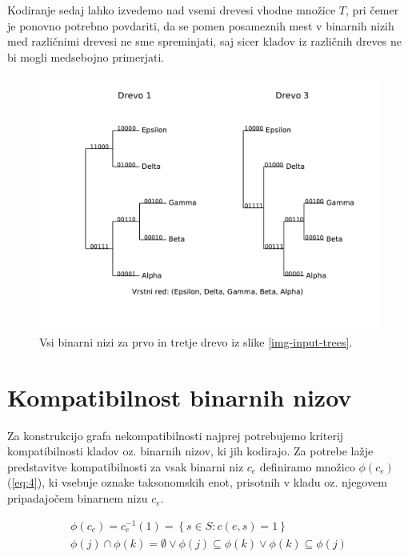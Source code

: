\documentclass[a4paper, 12pt]{book}
\begin{document}
Kodiranje sedaj lahko izvedemo nad vsemi drevesi vhodne množice $T$, pri čemer je ponovno potrebno povdariti, da se pomen posameznih mest v binarnih nizih med različnimi drevesi ne sme spreminjati, saj sicer kladov iz različnih dreves ne bi mogli medsebojno primerjati. 

\begin{figure}
	\begin{center}
		\includegraphics[scale=0.7, clip=true, trim=0 2cm 0 9mm]{gfx/bitstring_trees.pdf}
	\end{center}
	\caption{Vsi binarni nizi za prvo in tretje drevo iz slike \ref{img-input-trees}.}
	\label{img-bistring-trees-example}
\end{figure}

\section{Kompatibilnost binarnih nizov} 
Za konstrukcijo grafa nekompatibilnosti najprej potrebujemo kriterij kompatibilnosti kladov oz. binarnih nizov, ki jih kodirajo. Za potrebe lažje predstavitve kompatibilnosti za vsak binarni niz $c_e$ definiramo množico $\phi(c_e)$ (\ref{eq:4}), ki vsebuje oznake taksonomskih enot, prisotnih v kladu oz. njegovem pripadajočem binarnem nizu $c_e$. 

\begin{align}
	\phi(c_e) = c_e^{-1}(1) = \left\{ s \in S: c(e, s) = 1 \right\} \label{eq:4} \\
	\phi(j) \cap \phi(k) = \emptyset \lor \phi(j) \subseteq \phi(k) \lor \phi(k) \subseteq \phi(j) \label{eq:5}
\end{align} 
\end{document}
